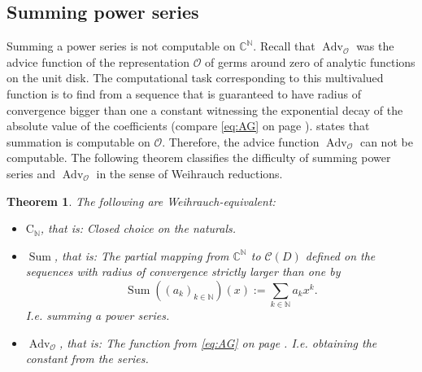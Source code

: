 \documentclass{eptcs-modified}
\newtheorem{theorem}{Theorem}
\newcommand{\CCN}{\mathrm{C}_{\NN}}
\newcommand{\NN}{\mathbb{N}}
\newcommand{\CC}{\mathbb{C}}
\newcommand{\OO}{\mathcal{O}}
\newcommand{\germs}{\OO}
\newcommand{\Sum}{\operatorname{Sum}}
\newcommand{\cont}{\mathcal C(D)}
\newcommand{\Advg}{\operatorname{Adv}_{\germs}}
\begin{document}
		\subsection{Summing power series}\label{sec:sub:summing power series}
			Summing a power series is not computable on $\CC^\NN$.
			Recall that $\Advg$ was the advice function of the representation $\germs$ of germs around zero of analytic functions on the unit disk.
			The computational task corresponding to this multivalued function is to find from a sequence that is guaranteed to have radius of convergence bigger than one a constant witnessing the exponential decay of the absolute value of the coefficients (compare \cref{eq:AG} on page \pageref{eq:AG}).
			 states that summation is computable on $\germs$.
			Therefore, the advice function $\Advg$ can not be computable.
			The following theorem classifies the difficulty of summing power series and $\Advg$ in the sense of Weihrauch reductions.

			\begin{theorem}\label{thm:main germs}
				The following are Weihrauch-equivalent:
				\begin{itemize}
					\item \textbf{$\CCN$}, that is: Closed choice on the naturals.
					\item \textbf{$\operatorname{Sum}$}, that is: The partial mapping from $\CC^\NN$ to $\cont$ defined on the sequences with radius of convergence strictly larger than one by
					\[ \Sum((a_k)_{k\in\NN})(x) := \sum_{k\in\NN} a_k x^k. \]
					I.e. summing a power series.
					\item \textbf{$\Advg$}, that is: The function from \cref{eq:AG} on page \pageref{eq:AG}. I.e. obtaining the constant from the series.
				\end{itemize}
			\end{theorem}
\end{document}

